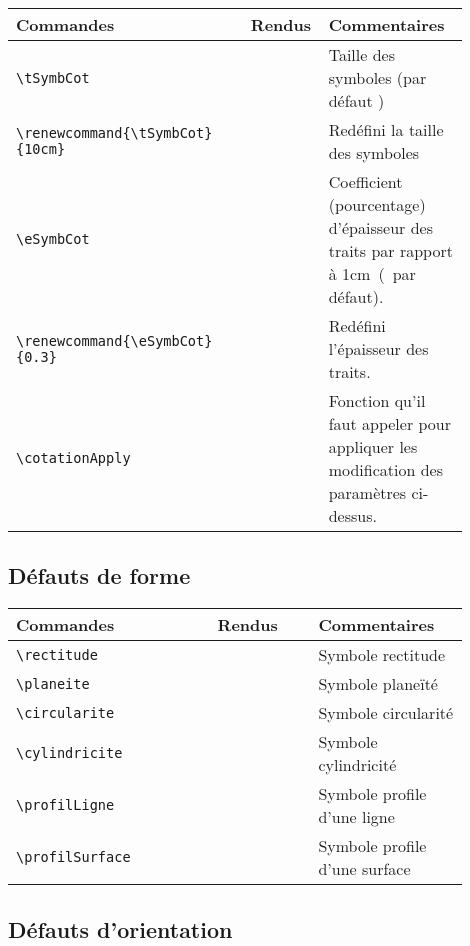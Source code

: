\documentclass[a4paper,12pt]{article}
\begin{document}
			\noindent
			\begin{tabular}{|p{0.5\linewidth}|p{0.1\linewidth}|p{0.3\linewidth}|}
				\hline
					\textbf{Commandes}&\textbf{Rendus}&\textbf{Commentaires}
				\\\hline\hline
					\verb!\tSymbCot!			&	\tSymbCot			&	Taille des symboles (par défaut \tSymbCot)
				\\\hline
					\verb!\renewcommand{\tSymbCot}{10cm}!	&	\renewcommand{\tSymbCot}{1cm}	&	Redéfini la taille des symboles
				\\\hline
					\verb!\eSymbCot!			&	\eSymbCot			&	Coefficient (pourcentage) d'épaisseur des traits par rapport à \tSymbCot\ (\eSymbCot\ par défaut).
				\\\hline
					\verb!\renewcommand{\eSymbCot}{0.3}!	&	\renewcommand{\eSymbCot}{0.3}	&	Redéfini l'épaisseur des traits.
				\\\hline
					\verb!\cotationApply!			&	\cotationApply			&	Fonction qu'il faut appeler pour appliquer les modification des paramètres ci-dessus.
				\\\hline
			\end{tabular}
	
		\subsection{Défauts de forme}

			\noindent
			\begin{tabular}{|p{0.4\linewidth}|p{0.2\linewidth}|p{0.3\linewidth}|}
				\hline
					\textbf{Commandes}&\textbf{Rendus}&\textbf{Commentaires}
				\\\hline\hline
					\verb!\rectitude!	&	\rectitude	&	Symbole rectitude
				\\\hline
					\verb!\planeite!	&	\planeite	&	Symbole planeïté
				\\\hline
					\verb!\circularite!	&	\circularite	&	Symbole circularité
				\\\hline
					\verb!\cylindricite!	&	\cylindricite	&	Symbole cylindricité
				\\\hline
					\verb!\profilLigne!	&	\profilLigne	&	Symbole profile d'une ligne
				\\\hline
					\verb!\profilSurface!	&	\profilSurface	&	Symbole profile d'une surface
				\\\hline
			\end{tabular}

		\subsection{Défauts d'orientation}
\end{document}
